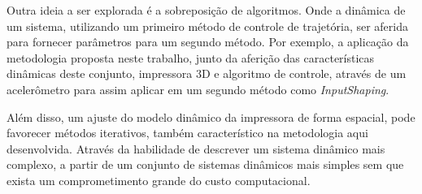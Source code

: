 Outra ideia a ser explorada é a sobreposição de algoritmos. Onde
a dinâmica de um sistema, utilizando um primeiro método de controle de trajetória, ser aferida para fornecer parâmetros para um segundo método. Por exemplo, a aplicação da metodologia proposta neste trabalho, junto da aferição das características dinâmicas deste conjunto, impressora 3D e algoritmo de controle, através de um acelerômetro para assim aplicar em um segundo método como \textit{InputShaping}.

Além disso, um ajuste do modelo dinâmico da impressora de forma espacial, pode favorecer métodos iterativos, também característico na metodologia aqui desenvolvida. Através da habilidade de descrever um sistema dinâmico mais complexo, a partir de um conjunto de sistemas dinâmicos mais simples sem que exista um comprometimento grande do custo computacional.


